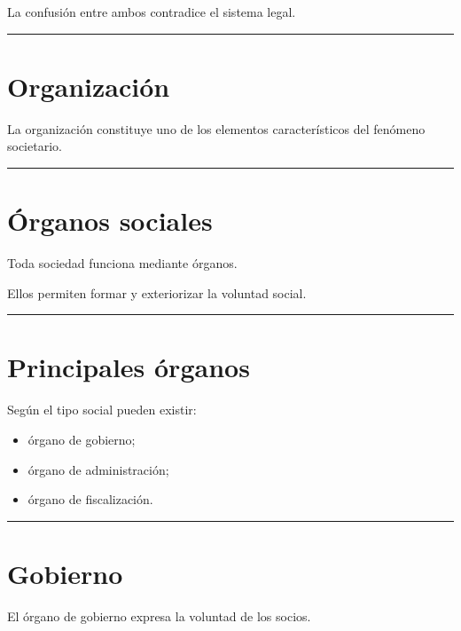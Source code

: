 \documentclass[
  spanish,
  letterpaper,
  DIV=11,
  numbers=noendperiod]{scrartcl}
\providecommand{\tightlist}{%
  \setlength{\itemsep}{0pt}\setlength{\parskip}{0pt}}
\begin{document}
La confusión entre ambos contradice el sistema legal.

\begin{center}\rule{0.5\linewidth}{0.5pt}\end{center}

\section{Organización}\label{organizaciuxf3n}

La organización constituye uno de los elementos característicos del
fenómeno societario.

\begin{center}\rule{0.5\linewidth}{0.5pt}\end{center}

\section{Órganos sociales}\label{uxf3rganos-sociales}

Toda sociedad funciona mediante órganos.

Ellos permiten formar y exteriorizar la voluntad social.

\begin{center}\rule{0.5\linewidth}{0.5pt}\end{center}

\section{Principales órganos}\label{principales-uxf3rganos}

Según el tipo social pueden existir:

\begin{itemize}
\tightlist
\item
  órgano de gobierno;
\item
  órgano de administración;
\item
  órgano de fiscalización.
\end{itemize}

\begin{center}\rule{0.5\linewidth}{0.5pt}\end{center}

\section{Gobierno}\label{gobierno}

El órgano de gobierno expresa la voluntad de los socios.
\end{document}
